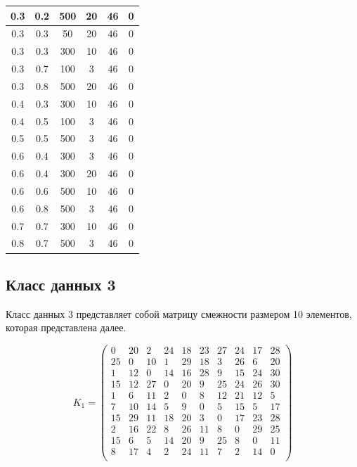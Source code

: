 \begin{center}
\begin{longtable}[c]{|c|c|c|c|c|c|}
        0.3 & 0.2 & 500 & 20 & 46 & 0 \\ \hline
        0.3 & 0.3 & 50 & 20 & 46 & 0 \\ \hline
        0.3 & 0.3 & 300 & 10 & 46 & 0 \\ \hline
        0.3 & 0.7 & 100 & 3 & 46 & 0 \\ \hline
        0.3 &  0.8 &  500 &   20 &    46 &     0 \\ \hline
        0.4 &  0.3 &  300 &   10 &    46 &     0 \\ \hline
        0.4 &  0.5 &  100 &    3 &    46 &     0 \\ \hline
        0.5 &  0.5 &  500 &    3 &    46 &     0 \\ \hline
        0.6 &  0.4 &  300 &    3 &    46 &     0 \\ \hline
        0.6 &  0.4 &  300 &   20 &    46 &     0 \\ \hline
        0.6 &  0.6 &  500 &   10 &    46 &     0 \\ \hline
        0.6 &  0.8 &  500 &    3 &    46 &     0 \\ \hline
        0.7 &  0.7 &  300 &   10 &    46 &     0 \\ \hline
        0.8 &  0.7 &  500 &    3 &    46 &     0 \\ \hline
\end{longtable}
\end{center}

\subsection{Класс данных 3}

Класс данных 3 представляет собой матрицу смежности размером 10 элементов, которая представлена далее.

\begin{equation}
	\label{eq:kd3}
	K_{1} = \begin{pmatrix}
		0 & 20 & 2 & 24 & 18 & 23 & 27 & 24 & 17 & 28 \\
		25 & 0 & 10 & 1 & 29 & 18 & 3 & 26 & 6 & 20 \\
		1 & 12 & 0 & 14 & 16 & 28 & 9 & 15 & 24 & 30 \\
		15 & 12 & 27 & 0 & 20 & 9 & 25 & 24 & 26 & 30 \\
		1 & 6 & 11 & 2 & 0 & 8 & 12 & 21 & 12 & 5 \\
		7 & 10 & 14 & 5 & 9 & 0 & 5 & 15 & 5 & 17 \\
		15 & 29 & 11 & 18 & 20 & 3 & 0 & 17 & 23 & 28 \\
		2 & 16 & 22 & 8 & 26 & 11 & 8 & 0 & 29 & 25 \\
		15 & 6 & 5 & 14 & 20 & 9 & 25 & 8 & 0 & 11 \\
		8 & 17 & 4 & 2 & 24 & 11 & 7 & 2 & 14 & 0 \\
	\end{pmatrix}
\end{equation}

